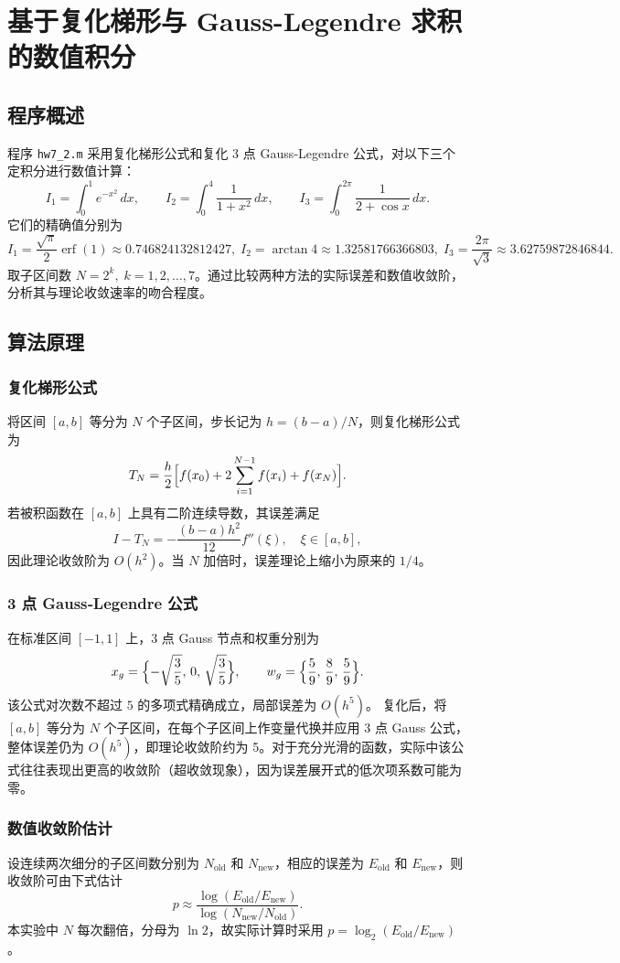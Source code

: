 \documentclass[12pt,a4paper]{article}
\begin{document}
\section{基于复化梯形与 Gauss-Legendre 求积的数值积分}

\subsection{程序概述}

程序 \texttt{hw7\_2.m} 采用复化梯形公式和复化 3 点 Gauss‑Legendre 公式，对以下三个定积分进行数值计算：
\[
I_1 = \int_0^1 e^{-x^2}\,dx,\qquad
I_2 = \int_0^4 \frac{1}{1+x^2}\,dx,\qquad
I_3 = \int_0^{2\pi} \frac{1}{2+\cos x}\,dx.
\]
它们的精确值分别为
\[
I_1=\frac{\sqrt{\pi}}{2}\operatorname{erf}(1)\approx0.746824132812427,\;
I_2=\arctan 4\approx1.32581766366803,\;
I_3=\frac{2\pi}{\sqrt{3}}\approx3.62759872846844.
\]
取子区间数 \(N=2^k,\;k=1,2,\dots,7\)。通过比较两种方法的实际误差和数值收敛阶，分析其与理论收敛速率的吻合程度。

\subsection{算法原理}

\subsubsection{复化梯形公式}
将区间 \([a,b]\) 等分为 \(N\) 个子区间，步长记为 \(h=(b-a)/N\)，则复化梯形公式为
\[
T_N = \frac{h}{2}\Bigl[f(x_0)+2\sum_{i=1}^{N-1}f(x_i)+f(x_N)\Bigr].
\]
若被积函数在 \([a,b]\) 上具有二阶连续导数，其误差满足
\[
I-T_N = -\frac{(b-a)h^2}{12}f''(\xi),\quad \xi\in[a,b],
\]
因此理论收敛阶为 \(O(h^2)\)。当 \(N\) 加倍时，误差理论上缩小为原来的 \(1/4\)。

\subsubsection{3 点 Gauss‑Legendre 公式}
在标准区间 \([-1,1]\) 上，3 点 Gauss 节点和权重分别为
\[
x_g = \Bigl\{-\sqrt{\frac{3}{5}},\,0,\,\sqrt{\frac{3}{5}}\Bigr\},\qquad
w_g = \Bigl\{\frac{5}{9},\,\frac{8}{9},\,\frac{5}{9}\Bigr\}.
\]
该公式对次数不超过 \(5\) 的多项式精确成立，局部误差为 \(O(h^5)\)。
复化后，将 \([a,b]\) 等分为 \(N\) 个子区间，在每个子区间上作变量代换并应用 3 点 Gauss 公式，整体误差仍为 \(O(h^5)\)，即理论收敛阶约为 5。对于充分光滑的函数，实际中该公式往往表现出更高的收敛阶（超收敛现象），因为误差展开式的低次项系数可能为零。

\subsubsection{数值收敛阶估计}
设连续两次细分的子区间数分别为 \(N_{\text{old}}\) 和 \(N_{\text{new}}\)，相应的误差为 \(E_{\text{old}}\) 和 \(E_{\text{new}}\)，则收敛阶可由下式估计
\[
p \approx \frac{\log(E_{\text{old}}/E_{\text{new}})}{\log(N_{\text{new}}/N_{\text{old}})}.
\]
本实验中 \(N\) 每次翻倍，分母为 \(\ln 2\)，故实际计算时采用 \(p = \log_2(E_{\text{old}}/E_{\text{new}})\)。
\end{document}
